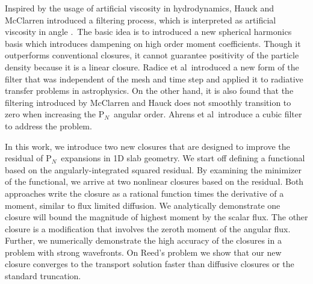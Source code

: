 \documentclass[review]{elsarticle}
\newcommand{\pn}{P$_N$}
\begin{document}
Inspired by the usage of artificial viscosity in hydrodynamics, Hauck and McClarren introduced a filtering process, which is interpreted as artificial viscosity in angle \cite{mccfpn09,McClarren:2010de}.\ The basic idea is to introduced a new spherical harmonics basis which introduces dampening on high order moment coefficients. Though it outperforms conventional closures, it cannot guarantee positivity of the particle density because it is a linear closure. Radice et al\ introduced a new form of the filter that was independent of the mesh and time step \cite{fpn_radice} and applied it to radiative transfer problems in astrophysics. {On the other hand, it is also found that the filtering introduced by McClarren and Hauck does not smoothly transition to zero when increasing the \pn\ angular order. Ahrens et al\ introduce a cubic filter to address the problem\cite{ahrens_fpn}.}


In this work, we introduce two new closures that are designed to improve the residual of \pn~expansions in 1D slab geometry. We start off defining a functional based on the angularly-integrated squared residual. By examining the minimizer of the functional, we arrive at two nonlinear closures based on the residual. Both approaches write the closure as a rational function times the derivative of a moment, similar to flux limited diffusion. We analytically demonstrate one closure will bound the magnitude of highest moment by the scalar flux. The other closure is a modification that involves the zeroth moment of the angular flux. Further, we numerically demonstrate the high accuracy of the closures in a problem with strong wavefronts. On Reed's problem \cite{reed_1971} we show that our new closure converges to the transport solution faster than diffusive closures or the standard truncation.
\end{document}
